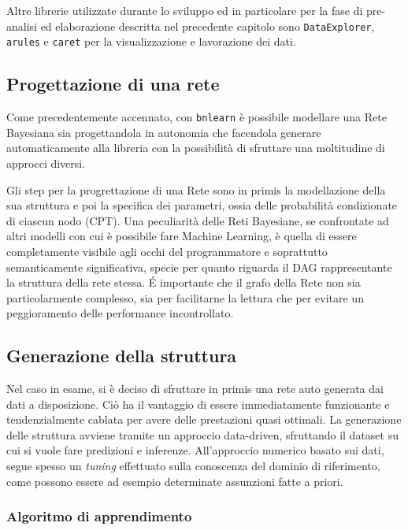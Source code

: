\documentclass[hidelinks, 12pt]{article}
\begin{document}
\vspace{3ex}

Altre librerie utilizzate durante lo sviluppo ed in particolare per la fase di pre-analisi ed elaborazione descritta nel precedente capitolo sono \texttt{DataExplorer}, \texttt{arules} e \texttt{caret} per la visualizzazione e lavorazione dei dati.



\subsection{Progettazione di una rete}

Come precedentemente accennato, con \texttt{bnlearn} è possibile modellare una Rete Bayesiana sia progettandola in autonomia che facendola generare automaticamente alla libreria con la possibilità di sfruttare una moltitudine di approcci diversi.

Gli step per la progrettazione di una Rete sono in primis la modellazione della sua struttura e poi la specifica dei parametri, ossia delle probabilità condizionate di ciascun nodo (CPT). Una peculiarità delle Reti Bayesiane, se confrontate ad altri modelli con cui è possibile fare Machine Learning, è quella di essere completamente visibile agli occhi del programmatore e soprattutto semanticamente significativa, specie per quanto riguarda il DAG rappresentante la struttura della rete stessa. \'E importante che il grafo della Rete non sia particolarmente complesso, sia per facilitarne la lettura che per evitare un peggioramento delle performance incontrollato.



\subsection{Generazione della struttura}

Nel caso in esame, si è deciso di sfruttare in primis una rete auto generata dai dati a disposizione. Ciò ha il vantaggio di essere immediatamente funzionante e tendenzialmente cablata per avere delle prestazioni quasi ottimali. La generazione delle struttura avviene tramite un approccio data-driven, sfruttando il dataset su cui si vuole fare predizioni e inferenze. All'approccio numerico basato sui dati, segue spesso un \textit{tuning} effettuato sulla conoscenza del dominio di riferimento, come possono essere ad esempio determinate assunzioni fatte a priori.


\subsubsection{Algoritmo di apprendimento}
\end{document}
